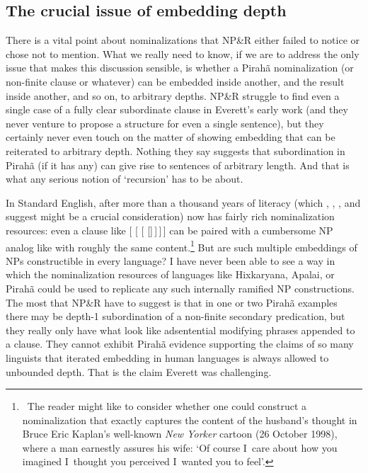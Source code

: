 \documentclass[output=paper,colorlinks,citecolor=brown
]{langscibook}
\begin{document}
\subsection{The crucial issue of embedding depth}

There is a vital point about nominalizations that NP\&R either failed
to notice or chose not to mention. What we really need to know, if we
are to address the only issue that makes this discussion sensible, is
whether a Pirah{\~a} nominalization (or non-finite clause or whatever)
can be embedded inside another, and the result inside another, and so
on, to arbitrary depths. NP\&R struggle to find even a single case of
a fully clear subordinate clause in Everett's early work (and they
never venture to propose a structure for even a single sentence), but
they certainly never even touch on the matter of showing embedding that
can be reiterated to arbitrary depth. Nothing they say suggests that
subordination in Pirah{\~a} (if it has any) can give rise to sentences
of arbitrary length. And that is what any serious notion of `recursion'
has to be about.

In Standard English, after more than a thousand years of literacy
(which \citealt{ONeil77}, \citealt{Givon79}, \citealt{Mithun84}, and
\citealt{Kalmar85} suggest might be a crucial consideration) now has
fairly rich nominalization resources: even a clause like
 [ [
[ []\,]\,]\,] can be paired with
a cumbersome NP analog like  with roughly
the same content.\footnote{\,
   The reader might like to consider whether one could construct a
   nominalization that exactly captures the content of the husband's
   thought in Bruce Eric Kaplan's well-known \textit{New Yorker}
   cartoon (26 October 1998), where a man earnestly assures his wife:
   `Of course I~care about how you imagined I~thought you perceived
   I~wanted you to feel'.}
But are such multiple embeddings of NPs constructible in every language?
I have never been able to see a way in which the nominalization resources
of languages like Hixkaryana, Apalai, or Pirah{\~a} could be used to
replicate any such internally ramified NP constructions. The most that
NP\&R have to suggest is that in one or two Pirah{\~a} examples there
may be depth-1 subordination of a non-finite secondary predication, but
they really only have what look like adsentential modifying phrases
appended to a clause. They cannot exhibit Pirah{\~a} evidence supporting
the claims of so many linguists that iterated embedding in human
languages is always allowed to unbounded depth. That is the claim
Everett was challenging.
\end{document}
